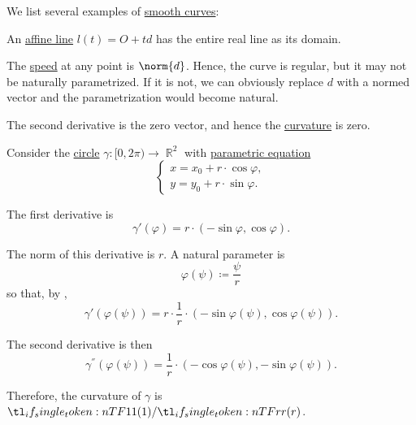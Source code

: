 \begin{example}\label{ex:def:smooth_curve}
  We list several examples of \hyperref[def:smooth_curve]{smooth curves}:
  \begin{thmenum}
     An \hyperref[def:affine_line]{affine line} \( l(t) = O + td \) has the entire real line as its domain.

    The \hyperref[def:smooth_curve/speed]{speed} at any point is \( \norm{d} \). Hence, the curve is regular, but it may not be naturally parametrized. If it is not, we can obviously replace \( d \) with a normed vector and the parametrization would become natural.

    The second derivative is the zero vector, and hence the \hyperref[def:smooth_curve/curvature]{curvature} is zero.

     Consider the \hyperref[def:circle]{circle} \( \gamma: [0, 2\pi) \to \BbbR^2 \) with \hyperref[eq:def:ellipse/parametric_equation]{parametric equation}
    \begin{equation*}
      \begin{cases}
        x = x_0 + r \cdot \cos \varphi, \\
        y = y_0 + r \cdot \sin \varphi.
      \end{cases}
    \end{equation*}

    The first derivative is
    \begin{equation*}
      \gamma'(\varphi) = r \cdot (-\sin \varphi, \cos \varphi).
    \end{equation*}

    The norm of this derivative is \( r \). A natural parameter is
    \begin{equation*}
      \varphi(\psi) \coloneqq \frac \psi r
    \end{equation*}
    so that, by ,
    \begin{equation*}
      \gamma'(\varphi(\psi)) = r \cdot \frac 1 r \cdot (-\sin \varphi(\psi), \cos \varphi(\psi)).
    \end{equation*}

    The second derivative is then
    \begin{equation*}
      \gamma^\dprime(\varphi(\psi)) = \frac 1 r \cdot (-\cos \varphi(\psi), -\sin \varphi(\psi)).
    \end{equation*}

    Therefore, the curvature of \( \gamma \) is \( \ifrac 1 r \).
  \end{thmenum}
\end{example}

